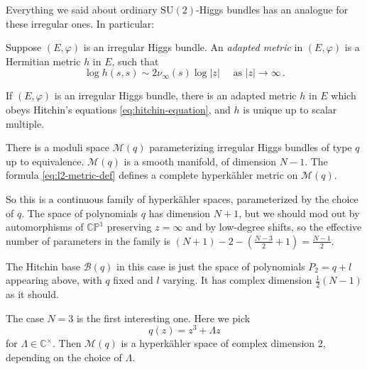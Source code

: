 \documentclass[12pt,letterpaper,reqno]{article}
\numberwithin{equation}{section}
\newcommand{\cB}{\ensuremath{\mathcal B}}
\newcommand{\cM}{\ensuremath{\mathcal M}}
\newcommand{\bbC}{\ensuremath{\mathbb C}}
\newcommand{\bbP}{\ensuremath{\mathbb P}}
\newcommand{\hk}{hyperk\"ahler\xspace}
\newcommand{\abs}[1]{\lvert#1\rvert}
\newcommand{\ti}[1]{\textit{#1}}
\newcommand{\SU}{\mathrm{SU}}
\newcommand{\fixme}[1]{{\color{orange}{[#1]}}}
\begin{document}
Everything we said about ordinary $\SU(2)$-Higgs bundles has an analogue for these 
irregular ones. 
In particular:

\begin{defn}
Suppose $(E,\varphi)$ is an irregular Higgs bundle. An \ti{adapted metric} in $(E,\varphi)$ is a Hermitian metric $h$ in $E$, such that
\begin{equation}
\log h(s,s) \sim 2 \nu_\infty(s) \log \abs{z} \quad \text{ as } \abs{z} \to \infty \, . 
\end{equation}
\end{defn}

\begin{thm}
If $(E,\varphi)$ is an irregular Higgs bundle, there is an adapted metric $h$ in $E$ which obeys Hitchin's equations \eqref{eq:hitchin-equation}, and $h$ is unique up to scalar multiple. \fixme{Mochizuki}
\end{thm}

\begin{thm}
There is a moduli space $\cM(q)$ parameterizing irregular Higgs bundles of type $q$ up to equivalence.
$\cM(q)$ is a smooth manifold, of dimension $N-1$.
The formula \eqref{eq:l2-metric-def} defines a complete \hk metric on $\cM(q)$.
\fixme{Biquard-Boalch plus epsilon}
\end{thm}

So this is a continuous family of \hk spaces, parameterized by the choice of $q$.
The space of polynomials $q$ has dimension $N+1$, but we should mod out by automorphisms
of $\bbC\bbP^1$ preserving $z = \infty$ and by low-degree shifts,
so the effective number of parameters in the family 
is $(N+1) - 2 - (\frac{N-3}{2} + 1) = \frac{N-1}{2}$.

The Hitchin base $\cB(q)$ in this case is just the space of polynomials 
$P_2 = q + l$ appearing above, with $q$ fixed and $l$ varying.
It has complex dimension $\frac12(N-1)$ as it should.

\begin{example}
The case $N=3$ is the first interesting one. Here we pick
\begin{equation}
  q(z) = z^3 + \Lambda z
\end{equation}
for $\Lambda \in \bbC^\times$. Then $\cM(q)$ is a \hk space of complex dimension $2$,
depending on the choice of $\Lambda$. \fixme{show picture of $\cB(q)$}
\end{example}


\end{document}
